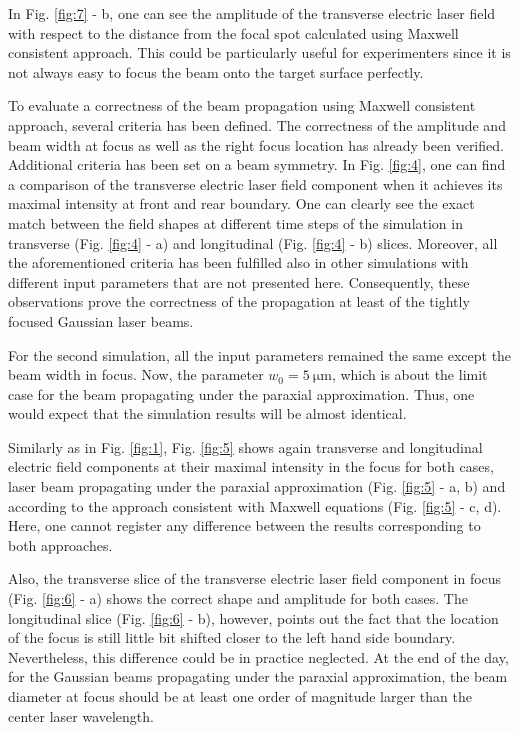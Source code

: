 In Fig. \ref{fig:7} - b, one can see the amplitude of the transverse electric laser field with respect to the distance from the focal spot calculated using Maxwell consistent approach. This could be particularly useful for experimenters since it is not always easy to focus the beam onto the target surface perfectly. 

To evaluate a correctness of the beam propagation using Maxwell consistent approach, several criteria has been defined. The correctness of the amplitude and beam width at focus as well as the right focus location has already been verified. Additional criteria has been set on a beam symmetry. In Fig. \ref{fig:4}, one can find a comparison of the transverse electric laser field component when it achieves its maximal intensity at front and rear boundary. One can clearly see the exact match between the field shapes at different time steps of the simulation in transverse (Fig. \ref{fig:4} - a) and longitudinal (Fig. \ref{fig:4} - b) slices. Moreover, all the aforementioned criteria has been fulfilled also in other simulations with different input parameters that are not presented here. Consequently, these observations prove the correctness of the propagation at least of the tightly focused Gaussian laser beams.

For the second simulation, all the input parameters remained the same except the beam width in focus. Now, the parameter $ w_0 = 5 \: \mathrm{\mu m} $, which is about the limit case for the beam propagating under the paraxial approximation. Thus, one would expect that the simulation results will be almost identical.

Similarly as in Fig. \ref{fig:1}, Fig. \ref{fig:5} shows again transverse and longitudinal electric field components at their maximal intensity in the focus for both cases, laser beam propagating under the paraxial approximation (Fig. \ref{fig:5} - a, b) and according to the approach consistent with Maxwell equations (Fig. \ref{fig:5} - c, d). Here, one cannot register any difference between the results corresponding to both approaches.

Also, the transverse slice of the transverse electric laser field component in focus (Fig. \ref{fig:6} - a) shows the correct shape and amplitude for both cases. The longitudinal slice (Fig. \ref{fig:6} - b), however, points out the fact that the location of the focus is still little bit shifted closer to the left hand side boundary. Nevertheless, this difference could be in practice neglected. At the end of the day, for the Gaussian beams propagating under the paraxial approximation, the beam diameter at focus should be at least one order of magnitude larger than the center laser wavelength.

